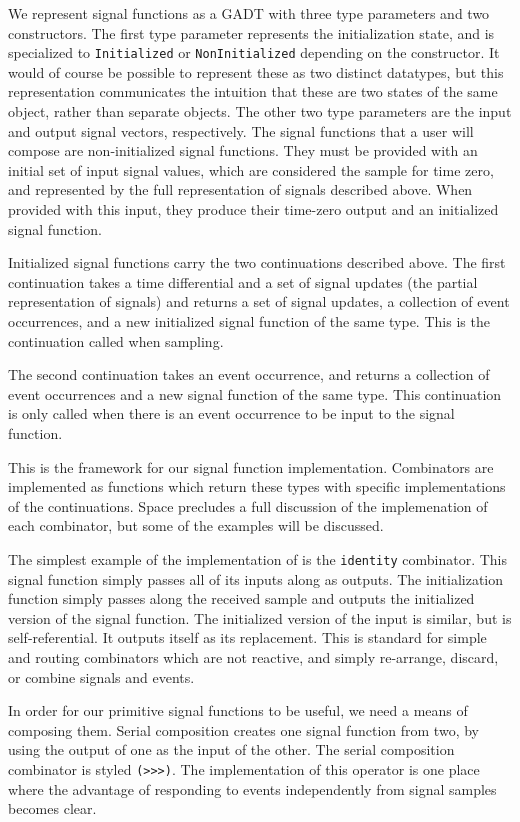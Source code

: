 We represent signal functions as a GADT with three type parameters and two 
constructors. The first type parameter represents the initialization state,
and is specialized to {\tt Initialized} or {\tt NonInitialized} depending on the
constructor. It would of course be possible to represent these as two distinct
datatypes, but this representation communicates the intuition that these are
two states of the same object, rather than separate objects. The other two type
parameters are the input and output signal vectors, respectively. The signal
functions that a user will compose are non-initialized signal functions.
They must be provided with an initial set of input signal values, which are considered
the sample for time zero, and represented by the full representation of signals
described above. When provided with this input, they produce their time-zero
output and an initialized signal function.

Initialized signal functions carry the two continuations described above.
The first continuation takes a time differential and a set of signal updates
(the partial representation of signals) and returns a set of signal updates, a
collection of event occurrences, and a new initialized signal function of the
same type. This is the continuation called when sampling.

The second continuation takes an event occurrence, and returns a collection of
event occurrences and a new signal function of the same type. This continuation
is only called when there is an event occurrence to be input to the signal
function.

This is the  framework for our signal function implementation.
Combinators are implemented as functions which return these types with specific
implementations of the continuations. Space precludes a full discussion of the
implemenation of each combinator, but some of the examples will be discussed.

The simplest example of the implementation of is the {\tt identity} combinator.
This signal function
simply passes all of its inputs along as outputs. The initialization function
simply passes along the received sample and outputs the initialized version of
the signal function. The initialized version of the input is similar, but is
self-referential. It outputs itself as its replacement. This is standard for
simple and routing combinators which are not reactive, and simply re-arrange,
discard, or combine signals and events.

In order for our primitive signal functions to be useful, we need a means of
composing them. Serial composition creates one signal function from two, by
using the output of one as the input of the other. The serial composition
combinator is styled {\tt (>>>)}. The implementation of this operator is one
place where the advantage of responding to events independently from signal
samples becomes clear. 

